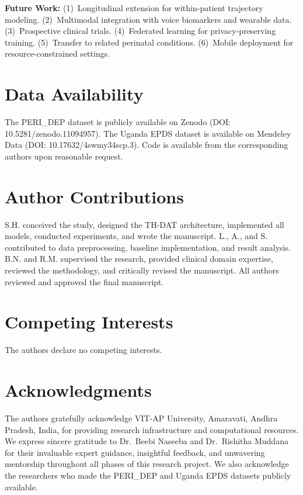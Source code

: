 \documentclass[12pt,a4paper]{article}
\begin{document}
\textbf{Future Work:} (1)~Longitudinal extension for within-patient trajectory modeling. (2)~Multimodal integration with voice biomarkers and wearable data. (3)~Prospective clinical trials. (4)~Federated learning for privacy-preserving training. (5)~Transfer to related perinatal conditions. (6)~Mobile deployment for resource-constrained settings.

\section*{Data Availability}
The PERI\_DEP dataset is publicly available on Zenodo (DOI: 10.5281/zenodo.11094957). The Uganda EPDS dataset is available on Mendeley Data (DOI: 10.17632/4swmy34scp.3). Code is available from the corresponding authors upon reasonable request.

\section*{Author Contributions}
S.H. conceived the study, designed the TH-DAT architecture, implemented all models, conducted experiments, and wrote the manuscript. L., A., and S. contributed to data preprocessing, baseline implementation, and result analysis. B.N. and R.M. supervised the research, provided clinical domain expertise, reviewed the methodology, and critically revised the manuscript. All authors reviewed and approved the final manuscript.

\section*{Competing Interests}
The authors declare no competing interests.

\section*{Acknowledgments}
The authors gratefully acknowledge VIT-AP University, Amaravati, Andhra Pradesh, India, for providing research infrastructure and computational resources. We express sincere gratitude to Dr.~Beebi Naseeba and Dr.~Rishitha Muddana for their invaluable expert guidance, insightful feedback, and unwavering mentorship throughout all phases of this research project. We also acknowledge the researchers who made the PERI\_DEP and Uganda EPDS datasets publicly available.
\end{document}

